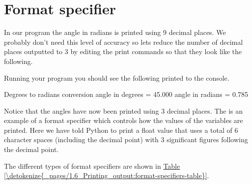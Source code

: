 \documentclass[letterpaper,10pt,english]{jupyterBook}
\begin{document}
\part{Format specifier}
\label{\detokenize{_pages/1.6_Printing_output:format-specifier}}
\sphinxAtStartPar
In our program the angle in radians is printed using 9 decimal places. We probably don’t need this level of accuracy so lets reduce the number of decimal places outputted to 3 by editing the print commands so that they look like the following.

\begin{sphinxVerbatim}[commandchars=\\\{\}]
\end{sphinxVerbatim}

\sphinxAtStartPar
Running your program you should see the following printed to the console.

\begin{sphinxVerbatim}[commandchars=\\\{\}]
Degrees to radians conversion
\PYGZhy{}\PYGZhy{}\PYGZhy{}\PYGZhy{}\PYGZhy{}\PYGZhy{}\PYGZhy{}\PYGZhy{}\PYGZhy{}\PYGZhy{}\PYGZhy{}\PYGZhy{}\PYGZhy{}\PYGZhy{}\PYGZhy{}\PYGZhy{}\PYGZhy{}\PYGZhy{}\PYGZhy{}\PYGZhy{}\PYGZhy{}\PYGZhy{}\PYGZhy{}\PYGZhy{}\PYGZhy{}\PYGZhy{}\PYGZhy{}\PYGZhy{}\PYGZhy{}
angle in degrees = 45.000
angle in radians =  0.785
\end{sphinxVerbatim}

\sphinxAtStartPar
Notice that the angles have now been printed using 3 decimal places. The  is an example of a format specifier which controls how the values of the variables are printed. Here we have told Python to print a float value that uses a total of 6 character spaces (including the decimal point) with 3 significant figures following the decimal point.

\sphinxAtStartPar
The different types of format specifiers are shown in \hyperref[\detokenize{_pages/1.6_Printing_output:format-specifiers-table}]{Table \ref{\detokenize{_pages/1.6_Printing_output:format-specifiers-table}}}.
\end{document}
